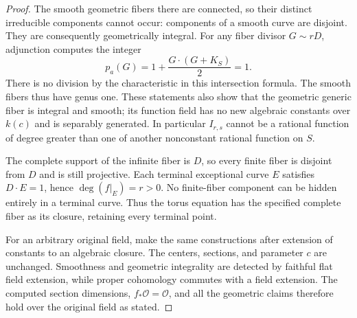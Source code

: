 \begin{proof}
The smooth geometric fibers there are connected, so their distinct
irreducible components cannot occur: components of a smooth curve
are disjoint.  They are consequently geometrically integral.
For any fiber divisor $G\sim rD$, adjunction computes the integer
\[
p_a(G)=1+\frac{G\cdot(G+K_S)}2=1.
\]
There is no division by the characteristic in this intersection
formula.  The smooth fibers thus have genus one.  These statements
also show that the geometric generic fiber is integral and smooth;
its function field has no new algebraic constants over $k(c)$ and
is separably generated.  In particular $I_{r,s}$ cannot be a rational
function of degree greater than one of another nonconstant rational
function on $S$.

The complete support of the infinite fiber is $D$, so every finite
fiber is disjoint from $D$ and is still projective.  Each terminal
exceptional curve $E$ satisfies $D\cdot E=1$, hence
$\deg(f|_E)=r>0$.  No finite-fiber component can be hidden entirely
in a terminal curve.  Thus the torus equation has the specified
complete fiber as its closure, retaining every terminal point.

For an arbitrary original field, make the same constructions after
extension of constants to an algebraic closure.  The centers,
sections, and parameter $c$ are unchanged.  Smoothness and geometric
integrality are detected by faithful flat field extension, while
proper cohomology commutes with a field extension.  The computed
section dimensions, $f_*\mathcal O=\mathcal O$, and all the geometric
claims therefore hold over the original field as stated.
\end{proof}
